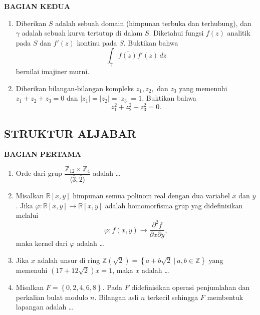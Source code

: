 \documentclass[12pt,twoside]{article}
\begin{document}
\newpage \textbf{BAGIAN KEDUA}
\begin{enumerate}
	\item Diberikan $S$ adalah sebuah domain (himpunan terbuka dan terhubung), dan $\gamma$ adalah sebuah kurva tertutup di dalam $S$. Diketahui fungsi $f(z)$ analitik pada $S$ dan $f'(z)$ kontinu pada $S$. Buktikan bahwa
	      \begin{equation*}
		      \displaystyle\int_{\gamma}^{}\overline{f(z)}f'(z)\,dz
	      \end{equation*}
	      bernilai imajiner murni.

	\item Diberikan bilangan-bilangan kompleks $z_1,z_2,$ dan $z_3$ yang memenuhi $z_1 + z_2 + z_3 = 0$ dan $|z_1|=|z_2|=|z_3|=1.$ Buktikan bahwa
	      \begin{equation*}
		      z^2_1 + z^2_2 + z^2 _3 = 0.
	      \end{equation*}
\end{enumerate}

\pagebreak
\subsection{STRUKTUR ALJABAR}
\textbf{BAGIAN PERTAMA}
\begin{enumerate}
	\item Orde dari grup $\dfrac{\mathbb{Z}_{12} \times \mathbb{Z}_4}{\langle \overline{3},\overline{2} \rangle}$ adalah \dots

	\item Misalkan $\mathbb{R}[x,y]$ himpunan semua polinom real dengan dua variabel $x$ dan $y$. Jika $\varphi : \mathbb{R}[x,y] \to \mathbb{R}[x,y]$ adalah homomorfisma grup yag didefinisikan melalui
	      \begin{equation*}
		      \varphi : f(x,y) \to \dfrac{\partial^2f}{\partial x \partial y},
	      \end{equation*}
	      maka kernel dari $\varphi$ adalah \dots

	\item Jika $x$ adalah unsur di ring $\mathbb{Z}(\sqrt{2}) = \left\lbrace a+b\sqrt{2}~|~a,b \in \mathbb{Z} \right\rbrace$ yang memenuhi $(17+12\sqrt{2})x=1$, maka $x$ adalah \dots

	\item Misalkan $F = \left\lbrace 0,2,4,6,8 \right\rbrace$. Pada $F$ didefinisikan operasi penjumlahan dan perkalian bulat modulo $n$. Bilangan asli $n$ terkecil sehingga  $F$ membentuk lapangan adalah \dots
\end{enumerate}
\end{document}
